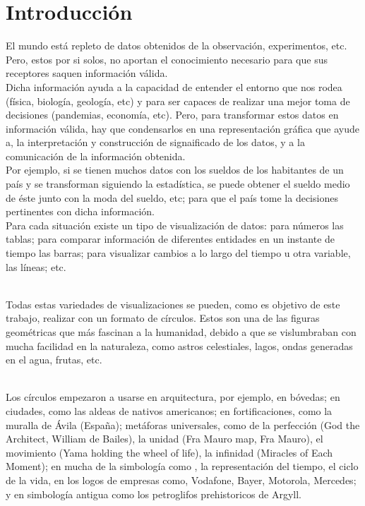 \documentclass{article}\usepackage[]{graphicx}\usepackage[]{color}
\begin{document}
\section{Introducci\'on}
El mundo est\'a repleto de datos obtenidos de la observaci\'on, experimentos, etc. Pero, estos por si solos, no aportan el conocimiento necesario para que sus receptores saquen informaci\'on v\'alida.~\\
Dicha informaci\'on ayuda a la capacidad de entender el entorno que nos rodea (f\'isica, biolog\'ia, geolog\'ia, etc) y para ser capaces de realizar una mejor toma de decisiones (pandemias, econom\'ia, etc).
Pero, para transformar estos datos en informaci\'on v\'alida, hay que condensarlos en una representaci\'on gr\'afica que ayude a, la interpretaci\'on y construcci\'on de signaificado de los datos, y a la comunicaci\'on de la informaci\'on obtenida.~\\
Por ejemplo, si se tienen muchos datos con los sueldos de los habitantes de un pa\'is y se transforman siguiendo la estad\'istica, se puede obtener el sueldo medio de \'este junto con la moda del sueldo, etc; para que el pa\'is tome la decisiones pertinentes con dicha informaci\'on.~\\
Para cada situaci\'on existe un tipo de visualizaci\'on de datos: para n\'umeros las tablas; para comparar informaci\'on de diferentes entidades en un instante de tiempo las barras; para visualizar cambios a lo largo del tiempo u otra variable, las l\'ineas; etc.~\\~\par
Todas estas variedades de visualizaciones se pueden, como  es objetivo de este trabajo, realizar con un formato de c\'irculos. Estos son una de las figuras geom\'etricas que m\'as fascinan a la humanidad, debido a que se vislumbraban con mucha facilidad en la naturaleza, como astros celestiales, lagos, ondas generadas en el agua, frutas, etc.~\\~\par
Los c\'irculos empezaron a usarse en arquitectura, por ejemplo, en b\'ovedas; en ciudades, como las aldeas de nativos americanos; en fortificaciones, como la muralla de \'Avila (Espa\~na); met\'aforas universales, como de la perfecci\'on (God the Architect, William de Bailes), la unidad (Fra Mauro map, Fra Mauro), el movimiento (Yama holding the wheel of life), la infinidad (Miracles of Each Moment); en mucha de la simbolog\'ia como , la representaci\'on del tiempo, el ciclo de la vida, en los logos de empresas como, Vodafone, Bayer, Motorola, Mercedes; y en simbolog\'ia antigua como los petroglifos prehistoricos de Argyll\cite[p\'ag 15-54]{Circle}.~\\~\par
\end{document}
